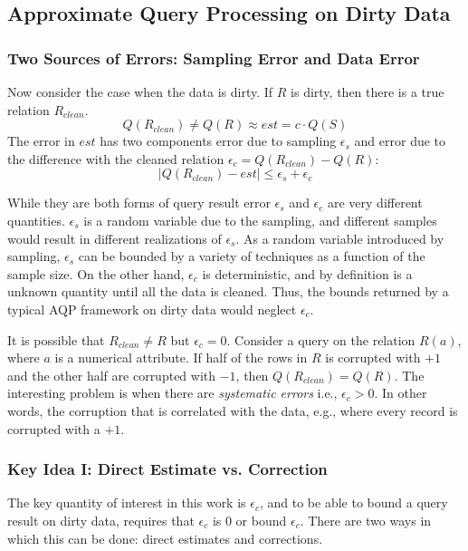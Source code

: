 \subsection{Approximate Query Processing on Dirty Data}


\subsubsection{Two Sources of Errors: Sampling Error and Data Error}
Now consider the case when the data is dirty.
If $R$ is dirty, then there is a true relation $R_{clean}$.
\[
Q(R_{clean}) \ne Q(R) \approx est = c \cdot Q(S)
\]
The error in $est$ has two components error due to sampling $\epsilon_s$ and error due to the difference with the cleaned relation $\epsilon_c = Q(R_{clean}) - Q(R)$:
\[
\mid Q(R_{clean}) - est \mid \le \epsilon_s + \epsilon_c
\]

While they are both forms of query result error $\epsilon_s$ and $\epsilon_c$ are very different quantities.
$\epsilon_s$ is a random variable due to the sampling, and different samples would result in different realizations of $\epsilon_s$.
As a random variable introduced by sampling, $\epsilon_s$ can be bounded by a variety of techniques as a function of the sample size.
On the other hand, $\epsilon_c$ is deterministic, and by definition is a unknown quantity until all the data is cleaned.
Thus, the bounds returned by a typical AQP framework on dirty data would neglect $\epsilon_c$.

It is possible that $R_{clean} \ne R$ but $\epsilon_c=0$.
Consider a \sumfunc query on the relation $R(a)$, where $a$ is a numerical attribute.
If half of the rows in $R$ is corrupted with $+1$ and the other half are corrupted with $-1$, then $Q(R_{clean}) = Q(R)$.
The interesting problem is when there are \emph{systematic errors}\cite{taylor1982introduction} i.e., $\epsilon_c > 0$. 
In other words, the corruption that is correlated with the data, e.g., where every record is corrupted with a $+1$.

\subsubsection{Key Idea I: Direct Estimate vs. Correction}
The key quantity of interest in this work is $\epsilon_c$, and to be able to bound
a query result on dirty data, requires that $\epsilon_c$ is 0 or bound $\epsilon_c$.
There are two ways in which this can be done: direct estimates and corrections.


